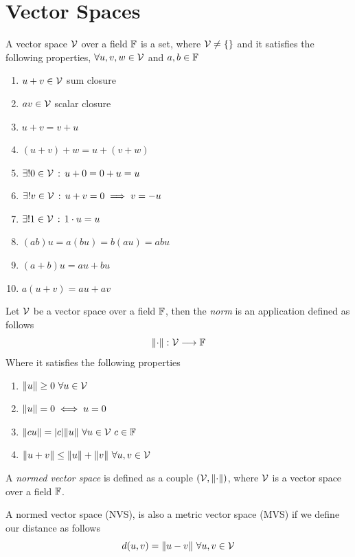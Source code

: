 \documentclass[../complete.tex]{subfiles}
\begin{document}
\section{Vector Spaces}
\begin{dfn}
	A vector space $\mathcal{V}$ over a field $\mathbb{F}$ is a set, where $\mathcal{V}\ne\{\}$ and it satisfies the following properties, $\forall u,v,w\in\mathcal{V}$ and $a,b\in\mathbb{F}$
	\begin{enumerate}
	\item $u+v\in\mathcal{V}$ sum closure
	\item $av\in\mathcal{V}$ scalar closure
	\item $u+v=v+u$
	\item $(u+v)+w=u+(v+w)$
	\item $\exists!0\in\mathcal{V}\, :\,  u+0=0+u=u$
	\item $\exists!v\in\mathcal{V}\, :\,  u+v=0\implies{} v=-u$
	\item $\exists!1\in\mathcal{V}\, :\,  1\cdot u=u$
	\item $(ab)u=a(bu)=b(au)=abu$
	\item $(a+b)u=au+bu$
	\item $a(u+v)=au+av$
	\end{enumerate}
\end{dfn}
\begin{dfn}[Norm]
	Let $\mathcal{V}$ be a vector space over a field $\mathbb{F}$, then the \textit{norm} is an application defined as follows
	\begin{equation*}
		\norm{\cdot}:\mathcal{V}\overset{}{\longrightarrow}\mathbb{F}
	\end{equation*}
	Where it satisfies the following properties
	\begin{enumerate}
	\item $\norm{u}\ge0\ \forall u\in\mathcal{V}$
	\item $\norm{u}=0\iff u=0$
	\item $\norm{cu}=\abs{c}\norm{u}\ \forall u\in\mathcal{V}\ c\in\mathbb{F}$
	\item $\norm{u+v}\le\norm{u}+\norm{v}\ \forall u,v\in\V$
	\end{enumerate}
\end{dfn}
\begin{dfn}
	A \textit{normed vector space} is defined as a couple $(\mathcal{V},\norm{\cdot})$, where $\mathcal{V}$ is a vector space over a field $\mathbb{F}$.
\end{dfn}
\begin{prop}
	A normed vector space (NVS), is also a metric vector space (MVS) if we define our distance as follows
	\begin{equation*}
		d(u,v)=\norm{u-v}\ \forall u,v\in\mathcal{V}
	\end{equation*}
\end{prop}
\end{document}
